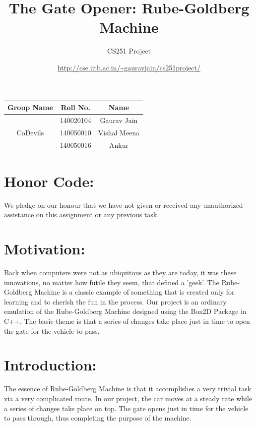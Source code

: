 \documentclass{article}
\title{The Gate Opener: Rube-Goldberg Machine}
\author{CS251 Project}
\date{\url{http://cse.iitb.ac.in/~gauravjain/cs251project/}}
\begin{document}
\maketitle

\begin{center}
\begin{tabular}{ |c|c|c| } 
\hline

  Group Name & Roll No. & Name\\
 \hline
  & 140020104 & Gaurav Jain   \\
  \cline{2-3}
  CoDevils & 140050010 & Vishal Meena\\ 
   \cline{2-3}
  & 140050016 & Ankur \\ 
 \hline
\end{tabular}
\end{center}

\section*{Honor Code:}
We pledge on our honour that we have not given or received any unauthorized assistance on this assignment or any previous task.

\section*{Motivation:} Back when computers were not as ubiquitous as they are today, it was these innovations, no matter how futile they seem, that defined a 'geek'. The Rube-Goldberg Machine is a classic example of something that is created only for learning and to cherish the fun in the process. Our project is an ordinary emulation of the Rube-Goldberg Machine designed using the Box2D Package in C++. The basic theme is that a series of changes take place just in time to open the gate for the vehicle to pass.
\newline

\section*{Introduction:} The essence of Rube-Goldberg Machine is that it accomplishes a very trivial task via a very complicated route. In our project, the car moves at a steady rate while a series of changes take place on top. The gate opens just in time for the vehicle to pass through, thus completing the purpose of the machine.
\end{document}
